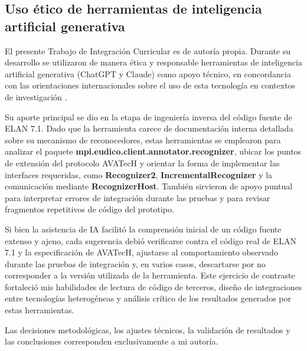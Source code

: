 \vspace{1\baselineskip}

\subsection{Uso ético de herramientas de inteligencia artificial generativa}

El presente Trabajo de Integración Curricular es de autoría propia. Durante su desarrollo se utilizaron de manera ética y responsable herramientas de inteligencia artificial generativa (ChatGPT y Claude) como apoyo técnico, en concordancia con las orientaciones internacionales sobre el uso de esta tecnología en contextos de investigación \cite{unesco2023guidance}.

Su aporte principal se dio en la etapa de ingeniería inversa del código fuente de ELAN 7.1. Dado que la herramienta carece de documentación interna detallada sobre su mecanismo de reconocedores, estas herramientas se emplearon para analizar el paquete \textbf{mpi.eudico.client.annotator.recognizer}, ubicar los puntos de extensión del protocolo AVATecH y orientar la forma de implementar las interfaces requeridas, como \textbf{Recognizer2}, \textbf{IncrementalRecognizer} y la comunicación mediante \textbf{RecognizerHost}. También sirvieron de apoyo puntual para interpretar errores de integración durante las pruebas y para revisar fragmentos repetitivos de código del prototipo.

Si bien la asistencia de IA facilitó la comprensión inicial de un código fuente extenso y ajeno, cada sugerencia debió verificarse contra el código real de ELAN 7.1 y la especificación de AVATecH, ajustarse al comportamiento observado durante las pruebas de integración y, en varios casos, descartarse por no corresponder a la versión utilizada de la herramienta. Este ejercicio de contraste fortaleció mis habilidades de lectura de código de terceros, diseño de integraciones entre tecnologías heterogéneas y análisis crítico de los resultados generados por estas herramientas.

Las decisiones metodológicas, los ajustes técnicos, la validación de resultados y las conclusiones corresponden exclusivamente a mi autoría.
\vspace{1\baselineskip}